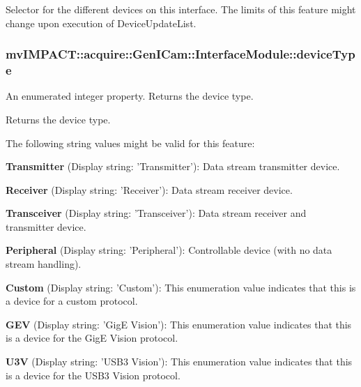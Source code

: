 Selector for the different devices on this interface. The limits of this feature might change upon execution of Device\+Update\+List. \hypertarget{classmv_i_m_p_a_c_t_1_1acquire_1_1_gen_i_cam_1_1_interface_module_a1077f343fc10b330c861edc4fc53c501}{
\subsubsection[{device\+Type}]{ mv\+I\+M\+P\+A\+C\+T\+::acquire\+::\+Gen\+I\+Cam\+::\+Interface\+Module\+::device\+Type}}\label{classmv_i_m_p_a_c_t_1_1acquire_1_1_gen_i_cam_1_1_interface_module_a1077f343fc10b330c861edc4fc53c501}


An enumerated integer property. Returns the device type. 

Returns the device type.

The following string values might be valid for this feature\+:
\begin{DoxyItemize}
\item {\bfseries Transmitter} (Display string\+: 'Transmitter')\+: Data stream transmitter device.
\item {\bfseries Receiver} (Display string\+: 'Receiver')\+: Data stream receiver device.
\item {\bfseries Transceiver} (Display string\+: 'Transceiver')\+: Data stream receiver and transmitter device.
\item {\bfseries Peripheral} (Display string\+: 'Peripheral')\+: Controllable device (with no data stream handling).
\item {\bfseries Custom} (Display string\+: 'Custom')\+: This enumeration value indicates that this is a device for a custom protocol.
\item {\bfseries G\+E\+V} (Display string\+: 'Gig\+E Vision')\+: This enumeration value indicates that this is a device for the Gig\+E Vision protocol.
\item {\bfseries U3\+V} (Display string\+: 'U\+S\+B3 Vision')\+: This enumeration value indicates that this is a device for the U\+S\+B3 Vision protocol.
\end{DoxyItemize}

